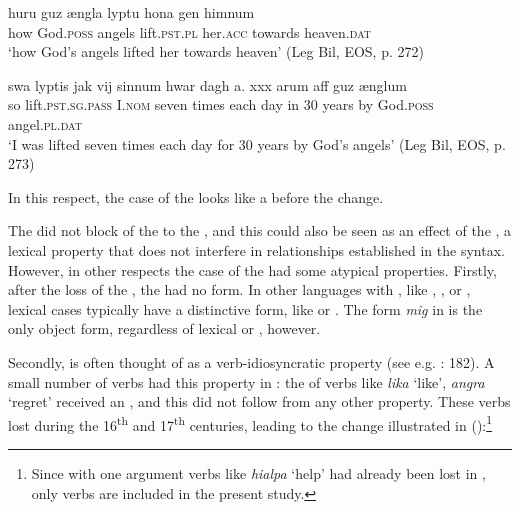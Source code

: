 \documentclass[output=paper]{langscibook}
\begin{document}
\ea\label{ex:falk:4a}
\gll huru  guz      ængla  lyptu      hona    gen    himnum\\
      how  God.\textsc{poss}  angels  lift.\textsc{pst}.\textsc{pl}  her.\textsc{acc}  towards  heaven.\textsc{dat}\\
\glt ‘how God’s angels lifted her towards heaven’ (Leg Bil, EOS, p. 272)

\ex\label{ex:falk:4b}
\gll swa  lyptis                                        jak               vij    sinnum  hwar  dagh  a.  xxx  arum  aff guz         ænglum\\
      so    lift.\textsc{pst}.\textsc{sg}.\textsc{pass}  I.\textsc{nom}  seven  times    each  day  in   30  years  by  God.\textsc{poss} angel.\textsc{pl.dat}\\
\glt ‘I was lifted seven times each day for 30 years by God’s angels’ (Leg Bil, EOS, p. 273)
    \z
    \z

In this respect, the case of the  looks like a  before the change. 


The  did not block  of the  to the , and this could also be seen as an effect of the , a lexical property that does not interfere in relationships established in the syntax. However, in other respects the case of the  had some atypical properties. Firstly, after the loss of the  , the  had no  form. In other languages with , like , , or , lexical cases typically have a distinctive form, like  or . The form \textit{mig} in  is the only object form, regardless of lexical or , however.



Secondly,  is often thought of as a verb-idiosyncratic property (see e.g. \citealt{Thrainsson2007}: 182). A small number of verbs had this property in : the  of verbs like \textit{lika} ‘like’, \textit{angra} ‘regret’ received an , and this did not follow from any other property. These verbs lost  during the 16\textsuperscript{th} and 17\textsuperscript{th} centuries, leading to the change illustrated in  (\citealt{Lindqvist1912,Falk1997}):\footnote{Since  with one argument verbs like \textit{hialpa} ‘help’ had already been lost in  \citep{Falk1995}, only  verbs are included in the present study.}
\end{document}
